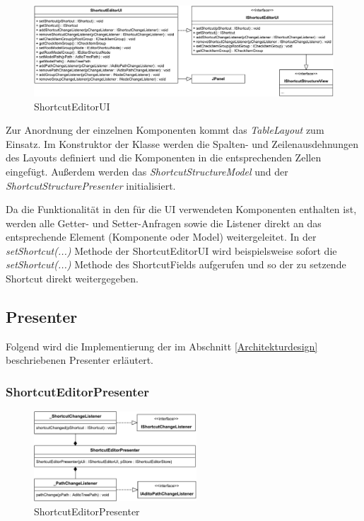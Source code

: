 \begin{figure}[H]
	\centering
	\includegraphics[width=1\linewidth]{../graphic/diagrams/CD_ShortcutEditorUI/ShortcutEditorUI}
	\caption{ShortcutEditorUI}
	\label{fig:shortcuteditorui}
\end{figure} 

\vspace{-12px}

Zur Anordnung der einzelnen Komponenten kommt das \emph{TableLayout} zum Einsatz. Im Konstruktor der Klasse werden die Spalten- und Zeilenausdehnungen des Layouts definiert und die Komponenten in die entsprechenden Zellen eingefügt. Außerdem werden das \emph{ShortcutStructureModel} und der \emph{ShortcutStructurePresenter} initialisiert. 

Da die Funktionalität in den für die UI verwendeten Komponenten enthalten ist, werden alle Getter- und Setter-Anfragen sowie die Listener direkt an das entsprechende Element (Komponente oder Model) weitergeleitet. In der \emph{setShortcut(...)} Methode der ShortcutEditorUI wird beispielsweise sofort die \emph{setShortcut(...)} Methode des ShortcutFields aufgerufen und so der zu setzende Shortcut direkt weitergegeben.

\newpage

\subsection{Presenter}

Folgend wird die Implementierung der im Abschnitt \ref{Architekturdesign} beschriebenen Presenter erläutert.

\subsubsection{ShortcutEditorPresenter}

\begin{figure}
	\vspace{-12px}
	\centering
	\includegraphics[width=230px]{../graphic/diagrams/CD_ShortcutEditorPresenter/ShortcutEditorPresenter}
	\caption{ShortcutEditorPresenter}
	\label{fig:shortcuteditorpresenter}
\end{figure}


